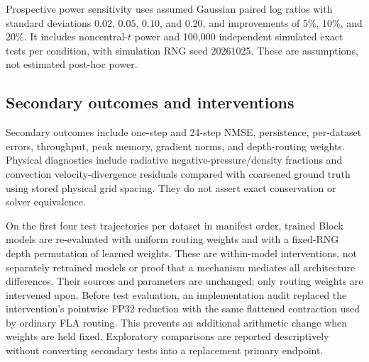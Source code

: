 Prospective power sensitivity uses assumed Gaussian paired log ratios with standard deviations $0.02$, $0.05$, $0.10$, and $0.20$, and improvements of 5\%, 10\%, and 20\%. It includes noncentral-$t$ power and 100,000 independent simulated exact tests per condition, with simulation RNG seed 20261025. These are assumptions, not estimated post-hoc power.

\subsection{Secondary outcomes and interventions}
Secondary outcomes include one-step and 24-step NMSE, persistence, per-dataset errors, throughput, peak memory, gradient norms, and depth-routing weights. Physical diagnostics include radiative negative-pressure/density fractions and convection velocity-divergence residuals compared with coarsened ground truth using stored physical grid spacing. They do not assert exact conservation or solver equivalence.

On the first four test trajectories per dataset in manifest order, trained Block models are re-evaluated with uniform routing weights and with a fixed-RNG depth permutation of learned weights. These are within-model interventions, not separately retrained models or proof that a mechanism mediates all architecture differences. Their sources and parameters are unchanged; only routing weights are intervened upon. Before test evaluation, an implementation audit replaced the intervention's pointwise FP32 reduction with the same flattened contraction used by ordinary FLA routing. This prevents an additional arithmetic change when weights are held fixed. Exploratory comparisons are reported descriptively without converting secondary tests into a replacement primary endpoint.
